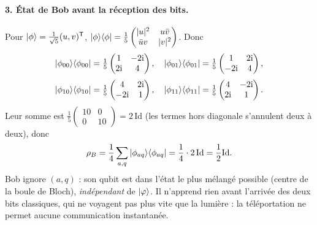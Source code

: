 \begin{correction}
\paragraph{3. État de Bob avant la réception des bits.} Pour $|\phi\rangle=\frac{1}{\sqrt5}(u,v)^{\mathsf T}$,
$|\phi\rangle\langle \phi|=\frac15\begin{pmatrix}|u|^2&u\bar v\\\bar uv&|v|^2\end{pmatrix}$. Donc
\[
  |\phi_{00}\rangle\langle \phi_{00}|=\tfrac15\begin{pmatrix}1&-2\mathrm{i}\\2\mathrm{i}&4\end{pmatrix},\quad
  |\phi_{01}\rangle\langle \phi_{01}|=\tfrac15\begin{pmatrix}1&2\mathrm{i}\\-2\mathrm{i}&4\end{pmatrix},
\]
\[
  |\phi_{10}\rangle\langle \phi_{10}|=\tfrac15\begin{pmatrix}4&2\mathrm{i}\\-2\mathrm{i}&1\end{pmatrix},\quad
  |\phi_{11}\rangle\langle \phi_{11}|=\tfrac15\begin{pmatrix}4&-2\mathrm{i}\\2\mathrm{i}&1\end{pmatrix}.
\]
Leur somme est $\frac15\begin{pmatrix}10&0\\0&10\end{pmatrix}=2\,\mathrm{Id}$ (les termes hors diagonale
s'annulent deux à deux), donc
\[
  \rho_B=\frac14\sum_{a,q}|\phi_{aq}\rangle\langle \phi_{aq}|=\frac14\cdot2\,\mathrm{Id}=\frac12\mathrm{Id}.
\]
Bob ignore $(a,q)$ : son qubit est dans l'état le plus mélangé possible (centre de la boule de Bloch),
\emph{indépendant} de $|\varphi\rangle$. Il n'apprend rien avant l'arrivée des deux bits classiques, qui
ne voyagent pas plus vite que la lumière : la téléportation ne permet aucune communication
instantanée.
\end{correction}
